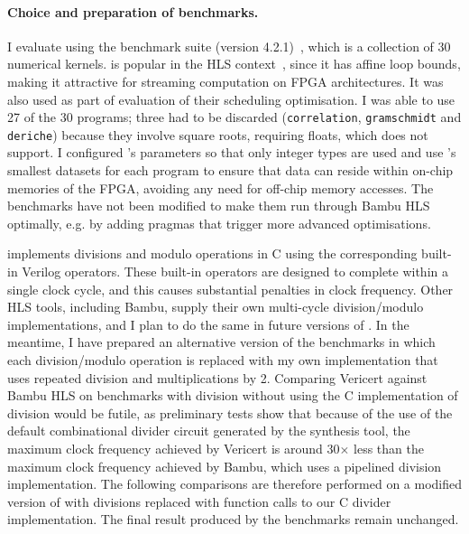 \paragraph{Choice and preparation of benchmarks.} I evaluate \vericert{} using
the \polybench{} benchmark suite (version 4.2.1)~\cite{pouchet20_polyb_c}, which
is a collection of 30 numerical kernels. \polybench{} is popular in the HLS
context~\cite{choi18_hbods,pouchet13_polyh,zhao17_comba,zuo13_improv}, since it
has affine loop bounds, making it attractive for streaming computation on FPGA
architectures.  It was also used as part of
\textcite{six22_formal_verif_super_sched} evaluation of their scheduling
optimisation.  I was able to use 27 of the 30 programs; three had to be
discarded (\texttt{cor\-re\-la\-tion}, \texttt{gram\-schmi\-dt} and
\texttt{de\-riche}) because they involve square roots, requiring floats, which
\vericert{} does not support.  I configured \polybench{}'s parameters so that
only integer types are used and use \polybench{}'s smallest datasets for each
program to ensure that data can reside within on-chip memories of the FPGA,
avoiding any need for off-chip memory accesses. The benchmarks have not been
modified to make them run through Bambu HLS optimally, e.g. by adding pragmas
that trigger more advanced optimisations.

\vericert{} implements divisions and modulo operations in C using the
corresponding built-in Verilog operators. These built-in operators are designed
to complete within a single clock cycle, and this causes substantial penalties
in clock frequency.  Other HLS tools, including Bambu, supply their own
multi-cycle division/modulo implementations, and I plan to do the same in future
versions of \vericert{}.  In the meantime, I have prepared an alternative
version of the benchmarks in which each division/modulo operation is replaced
with my own implementation that uses repeated division and multiplications by 2.
Comparing Vericert against Bambu HLS on benchmarks with division without using
the C implementation of division would be futile, as preliminary tests show that
because of the use of the default combinational divider circuit generated by the
synthesis tool, the maximum clock frequency achieved by Vericert is around
30$\times$ less than the maximum clock frequency achieved by Bambu, which uses a
pipelined division implementation.  The following comparisons are therefore
performed on a modified version of \polybench{} with divisions replaced with
function calls to our C divider implementation.  The final result produced by
the benchmarks remain unchanged.

